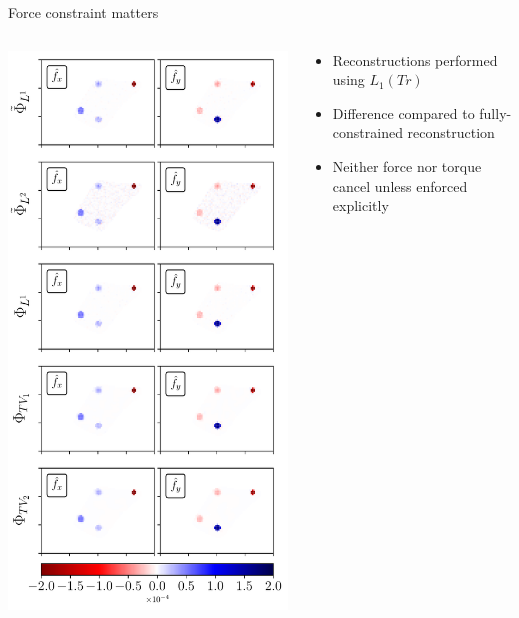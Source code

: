 \documentclass[presentation,aspectratio=169]{beamer}
\begin{document}
\begin{frame}{Force constraint matters}
\centering
\begin{columns}
\begin{column}{0.6\textwidth}
\includegraphics[width=\textwidth]{figures/fig3}
\end{column}
\begin{column}{0.4\textwidth}
\begin{itemize}
\item Reconstructions performed using $L_1(Tr)$
\item Difference compared to fully-constrained reconstruction
\item Neither force nor torque cancel unless enforced explicitly
\end{itemize}
\end{column}
\end{columns}
\end{frame}
\end{document}
